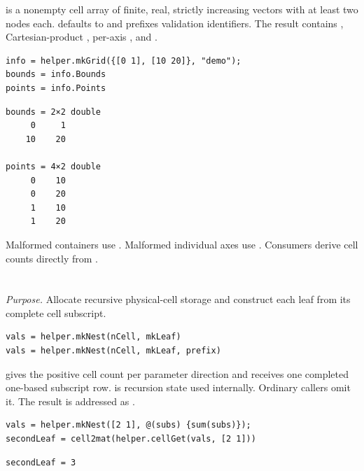 \descriptionhead
{} is a nonempty cell array of finite, real, strictly increasing vectors with at least two nodes each.   defaults to  and prefixes validation identifiers.  The result contains , Cartesian-product , per-axis , and .

\examplehead
\begin{lstlisting}[style=dpmatlab]
info = helper.mkGrid({[0 1], [10 20]}, "demo");
bounds = info.Bounds
points = info.Points
\end{lstlisting}
\begin{lstlisting}[style=dpoutput]
bounds = 2×2 double
     0     1
    10    20

points = 4×2 double
     0    10
     0    20
     1    10
     1    20
\end{lstlisting}

\remarkshead
Malformed containers use . Malformed individual axes use . Consumers derive cell counts directly from .

\section{\texorpdfstring{}{helper.mkNest}}

\textit{Purpose.} Allocate recursive physical-cell storage and construct each leaf from its complete cell subscript.

\syntaxhead
\begin{lstlisting}[style=dpsyntax]
vals = helper.mkNest(nCell, mkLeaf)
vals = helper.mkNest(nCell, mkLeaf, prefix)
\end{lstlisting}

\descriptionhead
{} gives the positive cell count per parameter direction and  receives one completed one-based subscript row.   is recursion state used internally. Ordinary callers omit it.  The result is addressed as .

\examplehead
\begin{lstlisting}[style=dpmatlab]
vals = helper.mkNest([2 1], @(subs) {sum(subs)});
secondLeaf = cell2mat(helper.cellGet(vals, [2 1]))
\end{lstlisting}
\begin{lstlisting}[style=dpoutput]
secondLeaf = 3
\end{lstlisting}

